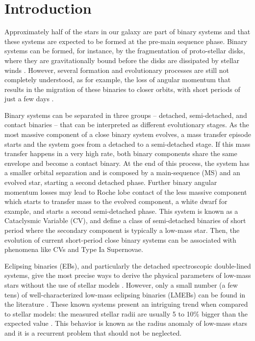 \documentclass[fleqn,usenatbib]{mnras}
\begin{document}
\section{Introduction}

Approximately half of the stars in our galaxy are part of binary systems \citep{Duquennoy91,Raghavan10} and that these systems are expected to be formed at the pre-main sequence phase. Binary systems can be formed, for instance, by the fragmentation of proto-stellar disks, where they are gravitationally bound before the disks are %
dissipated by stellar winds \citep[][and references therein]{Tobin13}. However, several formation and evolutionary processes are still not completely understood, as for example, the loss of angular momentum that results in the migration of these binaries to closer orbits, with short periods of just a few days \citep{Nefs12}.

Binary systems can be separated in three groups -- detached, semi-detached, and contact binaries -- that can be interpreted as different evolutionary stages. As the most massive component of a close binary system evolves, a mass transfer episode starts and the system goes from a detached to a semi-detached stage. If this mass transfer happens in a very high rate, both binary components share the same envelope and become a contact binary. At the end of this process, the system has a smaller orbital separation and is composed by a main-sequence (MS) and an evolved star, starting a second detached phase. Further binary angular momentum losses may lead to Roche lobe contact of the less massive component which starts to transfer mass to the evolved component, a white dwarf for example, and starts a second semi-detached phase. This system is known as a Cataclysmic Variable (CV), and define a class of semi-detached binaries of short period where the secondary component is typically a low-mass star. Then, the evolution of current short-period close binary systems can be associated with phenomena like CVs and Type Ia Supernovae. 

Eclipsing binaries (EBs), and particularly the detached spectroscopic double-lined systems, give the most precise ways to derive the physical parameters of low-mass stars without the use of stellar models \citep[][and references therein]{Andersen91,Torres10}. However, only a small number (a few tens) of well-characterized low-mass eclipsing binaries (LMEBs) can be found in the literature \citep{Southworth15}. These known systems present an intriguing trend when compared to stellar models: the measured stellar radii are usually 5 to 10\% bigger than the expected value \citep[e.g., ][]{Lopez05,Kraus11,Birkby12,Nefs13,Dittmann17}. This behavior is known as the radius anomaly of low-mass stars and it is a recurrent problem that should not be neglected.
\end{document}
